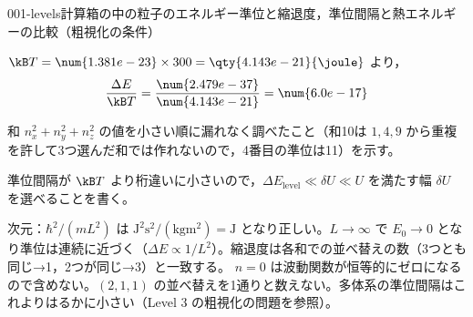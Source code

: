 \documentclass[uplatex,dvipdfmx,a4paper,11pt]{jsarticle}
\begin{document}
\begin{mondai}{001-levels}{計算}{箱の中の粒子のエネルギー準位と縮退度，準位間隔と熱エネルギーの比較（粗視化の条件）}
\begin{tadashii}
 $\kB T=\num{1.381e-23}\times300=\qty{4.143e-21}{\joule}$ より，
\[\frac{\Delta E}{\kB T}=\frac{\num{2.479e-37}}{\num{4.143e-21}}=\num{6.0e-17}\]
\begin{ronten}
  \item {} 和 $n_{x}^{2}+n_{y}^{2}+n_{z}^{2}$ の値を小さい順に漏れなく調べたこと（和10は $1,4,9$ から重複を許して3つ選んだ和では作れないので，4番目の準位は11）を示す。
  \item {} 準位間隔が $\kB T$ より桁違いに小さいので，$\Delta E_{\mathrm{level}}\ll\delta U\ll U$ を満たす幅 $\delta U$ を選べることを書く。
\end{ronten}
\kenzan 次元：$\hbar^{2}/(mL^{2})$ は $\unit{\joule\squared\second\squared}/(\unit{\kilogram\metre\squared})=\unit{\joule}$ となり正しい。$L\to\infty$ で $E_{0}\to0$ となり準位は連続に近づく（$\Delta E\propto1/L^{2}$）。縮退度は各和での並べ替えの数（3つとも同じ→1，2つが同じ→3）と一致する。
\tsumazuki $n=0$ は波動関数が恒等的にゼロになるので含めない。$(2,1,1)$ の並べ替えを1通りと数えない。多体系の準位間隔はこれよりはるかに小さい（Level 3 の粗視化の問題を参照）。
\end{tadashii}
\end{mondai}
\end{document}
